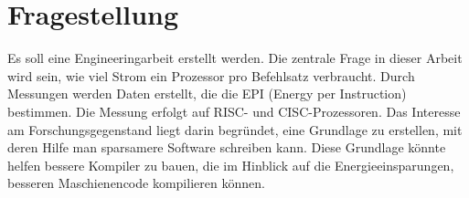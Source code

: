 \section{Fragestellung}

Es soll eine Engineeringarbeit erstellt werden. Die zentrale Frage in dieser Arbeit wird sein, wie viel Strom ein Prozessor pro Befehlsatz
verbraucht. Durch Messungen werden Daten erstellt, die die EPI (Energy per Instruction)
bestimmen. Die Messung erfolgt auf RISC- und CISC-Prozessoren. Das Interesse am Forschungsgegenstand liegt darin begründet, eine Grundlage
zu erstellen, mit deren Hilfe man sparsamere Software schreiben kann. Diese Grundlage könnte helfen bessere Kompiler zu bauen,
die im Hinblick auf die Energieeinsparungen, besseren Maschienencode kompilieren können. 


